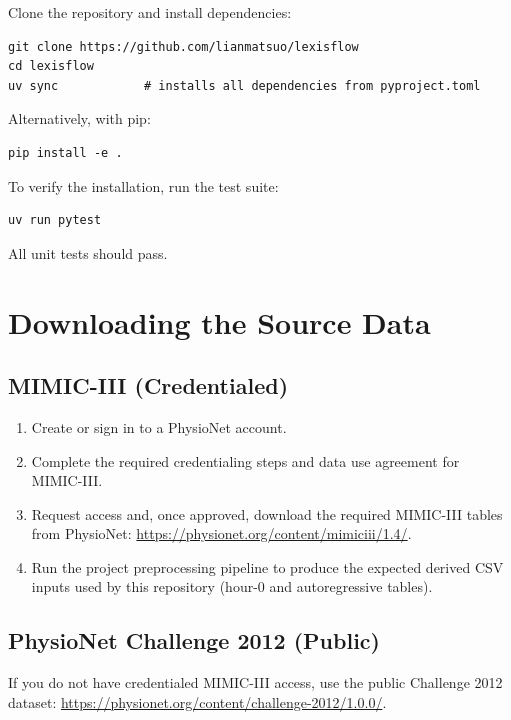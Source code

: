 Clone the repository and install dependencies:

\begin{verbatim}
git clone https://github.com/lianmatsuo/lexisflow
cd lexisflow
uv sync            # installs all dependencies from pyproject.toml
\end{verbatim}

Alternatively, with pip:

\begin{verbatim}
pip install -e .
\end{verbatim}

To verify the installation, run the test suite:

\begin{verbatim}
uv run pytest
\end{verbatim}

All unit tests should pass.

\section{Downloading the Source Data}

\subsection{MIMIC-III (Credentialed)}

\begin{enumerate}\tightlist
    \item Create or sign in to a PhysioNet account.
    \item Complete the required credentialing steps and data use agreement for MIMIC-III.
    \item Request access and, once approved, download the required MIMIC-III tables from PhysioNet:
    \url{https://physionet.org/content/mimiciii/1.4/}.
    \item Run the project preprocessing pipeline to produce the expected derived CSV inputs used by this repository (hour-0 and autoregressive tables).
\end{enumerate}

\subsection{PhysioNet Challenge 2012 (Public)}

If you do not have credentialed MIMIC-III access, use the public Challenge 2012 dataset:
\url{https://physionet.org/content/challenge-2012/1.0.0/}.

